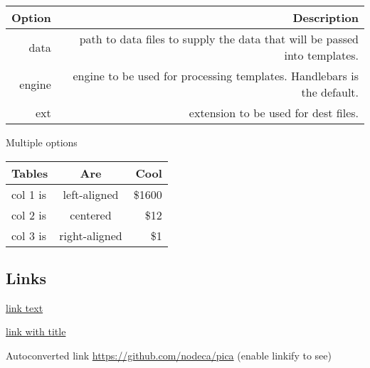 \documentclass[]{article}
\begin{document}
\begin{longtable}[]{@{}rr@{}}
\toprule
\begin{minipage}[b]{0.10\columnwidth}\raggedleft\strut
Option\strut
\end{minipage} & \begin{minipage}[b]{0.17\columnwidth}\raggedleft\strut
Description\strut
\end{minipage}\tabularnewline
\midrule
\endhead
\begin{minipage}[t]{0.10\columnwidth}\raggedleft\strut
data\strut
\end{minipage} & \begin{minipage}[t]{0.17\columnwidth}\raggedleft\strut
path to data files to supply the data that will be passed into
templates.\strut
\end{minipage}\tabularnewline
\begin{minipage}[t]{0.10\columnwidth}\raggedleft\strut
engine\strut
\end{minipage} & \begin{minipage}[t]{0.17\columnwidth}\raggedleft\strut
engine to be used for processing templates. Handlebars is the
default.\strut
\end{minipage}\tabularnewline
\begin{minipage}[t]{0.10\columnwidth}\raggedleft\strut
ext\strut
\end{minipage} & \begin{minipage}[t]{0.17\columnwidth}\raggedleft\strut
extension to be used for dest files.\strut
\end{minipage}\tabularnewline
\bottomrule
\end{longtable}

Multiple options

\begin{longtable}[]{@{}lcr@{}}
\toprule
Tables & Are & Cool\tabularnewline
\midrule
\endhead
col 1 is & left-aligned & \$1600\tabularnewline
col 2 is & centered & \$12\tabularnewline
col 3 is & right-aligned & \$1\tabularnewline
\bottomrule
\end{longtable}

\subsection{Links}\label{links}

\href{http://dev.nodeca.com}{link text}

\href{http://nodeca.github.io/pica/demo/}{link with title}

Autoconverted link \url{https://github.com/nodeca/pica} (enable linkify
to see)
\end{document}
